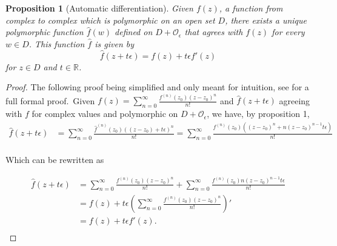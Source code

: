 \documentclass{article}
\newtheorem{proposition}[theorem]{Proposition}
\newcommand{\R}{\mathbb{R}}
\newcommand{\Z}{\mathcal{O}_\e}
\newcommand{\e}{\epsilon}
\begin{document}
\begin{proposition}[Automatic differentiation]\label{pr:auto}
        Given $f(z)$, a function from complex to complex which is polymorphic on an open set $D$, there exists a unique polymorphic function $\hat{f}(w)$ defined on $D + \Z$ that agrees with $f(z)$ for every $w \in D$. This function $\hat{f}$ is given by
\begin{equation}
        \hat{f}(z + t\e) = f(z) + t \e f'(z)
\end{equation}
for $z \in D$ and $t \in \R$.
\end{proposition}
\begin{proof}
The following proof being simplified and only meant for intuition, see \cite{messelmi2015} for a full formal proof.\ Given $f(z) = \sum_{n=0}^\infty \frac{f^{(n)}(z_0)(z-z_0)^n}{n!} $ and $\hat{f}(z+t\e)$ agreeing with $f$ for complex values and polymorphic on $D+\Z$, we have, by proposition 1,
\begin{equation}
\begin{split}
        \hat{f}(z + t \e) &= \sum_{n=0}^\infty \frac{\hat{f}^{(n)}(z_0) ((z-z_0) + t\e)^n}{n!}
                           = \sum_{n=0}^\infty \frac{f^{(n)}(z_0) ((z-z_0)^n + n(z-z_0)^{n-1}t\e)}{n!} \\
\end{split}
\end{equation}

Which can be rewritten as

\begin{equation}
\begin{split}
        \hat{f}(z + t \e) &= \sum_{n=0}^\infty \frac{f^{(n)}(z_0) (z-z_0)^n}{n!} + \sum_{n=0}^\infty \frac{f^{(n)}(z_0) n(z-z_0)^{n-1}t\e}{n!} \\
                          &= f(z) + t \e (\sum_{n=0}^\infty \frac{f^{(n)}(z_0) (z-z_0)^n}{n!})' \\
                          &= f(z) + t \e f'(z). \\
\end{split}
\end{equation}
\end{proof}
\end{document}
